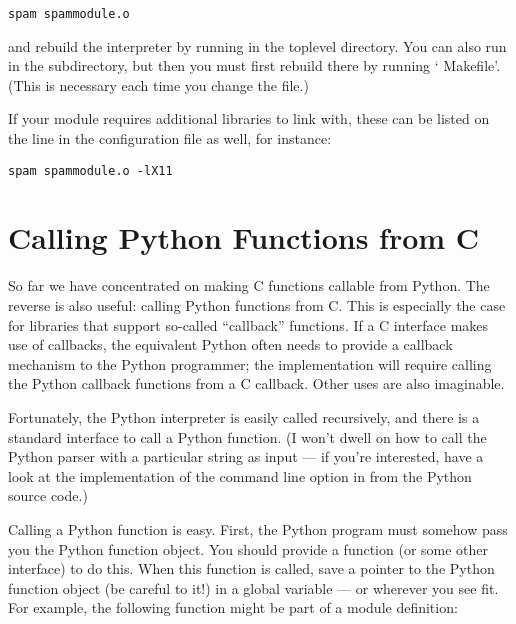 \documentclass{manual}
\begin{document}
\begin{verbatim}
spam spammodule.o
\end{verbatim}

and rebuild the interpreter by running  in the toplevel
directory.  You can also run  in the 
subdirectory, but then you must first rebuild 
there by running ` Makefile'.  (This is necessary each
time you change the  file.)

If your module requires additional libraries to link with, these can
be listed on the line in the configuration file as well, for instance:

\begin{verbatim}
spam spammodule.o -lX11
\end{verbatim}

\section{Calling Python Functions from C
         \label{callingPython}}

So far we have concentrated on making C functions callable from
Python.  The reverse is also useful: calling Python functions from C.
This is especially the case for libraries that support so-called
``callback'' functions.  If a C interface makes use of callbacks, the
equivalent Python often needs to provide a callback mechanism to the
Python programmer; the implementation will require calling the Python
callback functions from a C callback.  Other uses are also imaginable.

Fortunately, the Python interpreter is easily called recursively, and
there is a standard interface to call a Python function.  (I won't
dwell on how to call the Python parser with a particular string as
input --- if you're interested, have a look at the implementation of
the  command line option in 
from the Python source code.)

Calling a Python function is easy.  First, the Python program must
somehow pass you the Python function object.  You should provide a
function (or some other interface) to do this.  When this function is
called, save a pointer to the Python function object (be careful to
 it!) in a global variable --- or wherever you
see fit. For example, the following function might be part of a module
definition:
\end{document}
